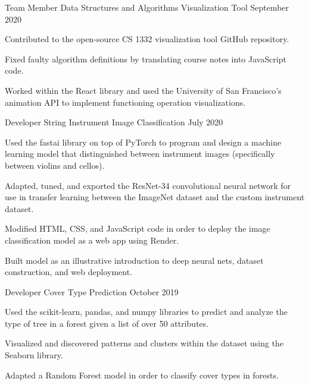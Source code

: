 \begin{cventries}
\cvproject
{Team Member} %
{Data Structures and Algorithms Visualization Tool} %
{} %
{September 2020} %
{ %
\begin{cvitems}
\item Contributed to the open-source CS 1332 visualization tool GitHub repository.
\item Fixed faulty algorithm definitions by translating course notes
into JavaScript code.
\item Worked within the React library and used the University of San Francisco's animation
API to implement functioning operation visualizations.
\end{cvitems}
}

\cvproject
{Developer} %
{String Instrument Image Classification} %
{} %
{July 2020} %
{ %
\begin{cvitems}
\item Used the fastai library on top of PyTorch to program and design a machine learning model that
distinguished between instrument images (specifically between violins and cellos).
\item Adapted, tuned, and exported the ResNet-34 convolutional neural network for use in transfer learning between the ImageNet dataset and the custom instrument dataset.
\item Modified HTML, CSS, and JavaScript code in order to deploy the image classification model as a web app using Render.
\item Built model as an illustrative introduction to deep neural nets, dataset construction, and web deployment. 
\end{cvitems}
}

\cvproject
{Developer} %
{Cover Type Prediction} %
{} %
{October 2019} %
{ %
\begin{cvitems}
\item Used the scikit-learn, pandas, and numpy libraries to predict and analyze the type of tree in a forest given a list of over 50 attributes.
\item Visualized and discovered patterns and clusters within the dataset using the Seaborn library.
\item Adapted a Random Forest model in order to classify cover types in forests.
\end{cvitems}
}


\end{cventries}
